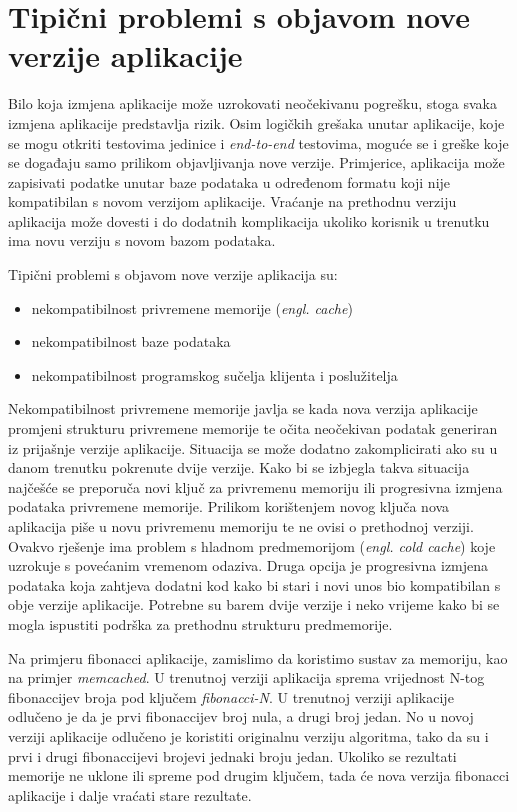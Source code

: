 \section{Tipični problemi s objavom nove verzije aplikacije}
Bilo koja izmjena aplikacije može uzrokovati neočekivanu pogrešku, stoga svaka izmjena aplikacije
predstavlja rizik. Osim logičkih grešaka unutar aplikacije, koje se mogu otkriti testovima jedinice
i \textit{end-to-end} testovima, moguće se i greške koje se događaju samo prilikom objavljivanja
nove verzije. Primjerice, aplikacija može zapisivati podatke unutar baze podataka u određenom
formatu koji nije kompatibilan s novom verzijom aplikacije. Vraćanje na prethodnu verziju aplikacija
može dovesti i do dodatnih komplikacija ukoliko korisnik u trenutku ima novu verziju s novom bazom
podataka.

Tipični problemi s objavom nove verzije aplikacija su:
\begin{itemize}
    \item nekompatibilnost privremene memorije (\textit{engl. cache})
    \item nekompatibilnost baze podataka
    \item nekompatibilnost programskog sučelja klijenta i poslužitelja
\end{itemize}

Nekompatibilnost privremene memorije javlja se kada nova verzija aplikacije promjeni strukturu
privremene memorije te očita neočekivan podatak generiran iz prijašnje verzije aplikacije. Situacija
se može dodatno zakomplicirati ako su u danom trenutku pokrenute dvije verzije. Kako bi se izbjegla
takva situacija najčešće se preporuča novi ključ za privremenu memoriju ili progresivna izmjena
podataka privremene memorije. Prilikom korištenjem novog ključa nova aplikacija piše u novu
privremenu memoriju te ne ovisi o prethodnoj verziji. Ovakvo rješenje ima problem s hladnom
predmemorijom (\textit{engl. cold cache}) koje uzrokuje s povećanim vremenom odaziva. Druga opcija
je progresivna izmjena podataka koja zahtjeva dodatni kod kako bi stari i novi unos bio kompatibilan
s obje verzije aplikacije. Potrebne su barem dvije verzije i neko vrijeme kako bi se mogla ispustiti
podrška za prethodnu strukturu predmemorije.

Na primjeru fibonacci aplikacije, zamislimo da koristimo sustav za memoriju, kao na primjer
\textit{memcached}. U trenutnoj verziji aplikacija sprema vrijednost N-tog fibonaccijev broja pod
ključem \textit{fibonacci-N}. U trenutnoj verziji aplikacije odlučeno je da je prvi fibonaccijev
broj nula, a drugi broj jedan. No u novoj verziji aplikacije odlučeno je koristiti originalnu
verziju algoritma, tako da su i prvi i drugi fibonaccijevi brojevi jednaki broju jedan. Ukoliko se
rezultati memorije ne uklone ili spreme pod drugim ključem, tada će nova verzija fibonacci
aplikacije i dalje vraćati stare rezultate.


